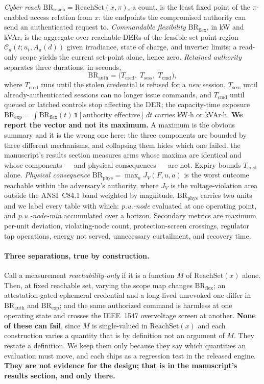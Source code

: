 \documentclass[review]{elsarticle}
\newcommand{\BRreach}{\mathrm{BR}_{\mathrm{reach}}}
\newcommand{\BRflex}{\mathrm{BR}_{\mathrm{flex}}}
\newcommand{\BRauth}{\mathrm{BR}_{\mathrm{auth}}}
\newcommand{\BRexp}{\mathrm{BR}_{\mathrm{exp}}}
\newcommand{\BRphys}{\mathrm{BR}_{\mathrm{phys}}}
\newcommand{\Reach}{\mathrm{ReachSet}}
\begin{document}
\emph{Cyber reach} $\BRreach=\Reach(x,\pi)$, a count, is the least fixed point of the
$\pi$-enabled access relation from $x$: the endpoints the compromised authority can send an
authenticated request to. \emph{Commandable flexibility} $\BRflex$, in kW and kVAr, is the
aggregate over reachable DERs of the feasible set-point region
$\mathcal{C}_d(t;u_t,A_\pi(d))$ given irradiance, state of charge, and inverter limits; a
read-only scope yields the current set-point alone, hence zero. \emph{Retained authority}
separates three durations, in seconds,
\begin{equation}
\BRauth=\big(T_{\mathrm{cred}},\;T_{\mathrm{sess}},\;T_{\mathrm{cmd}}\big),
\end{equation}
where $T_{\mathrm{cred}}$ runs until the stolen credential is refused for a \emph{new} session,
$T_{\mathrm{sess}}$ until already-authenticated sessions can no longer issue commands, and
$T_{\mathrm{cmd}}$ until queued or latched controls stop affecting the DER; the capacity-time
exposure $\BRexp=\int \BRflex(t)\,\mathbf{1}[\text{authority effective}]\,dt$ carries
kW$\cdot$h or kVAr$\cdot$h. \textbf{We report the vector and not its maximum.} A maximum is the
obvious summary and it is the wrong one here: the three components are bounded by three different
mechanisms, and collapsing them hides which one failed. the manuscript's results section measures arms
whose maxima are identical and whose components --- and physical consequences --- are not. Expiry
bounds $T_{\mathrm{cred}}$ alone. \emph{Physical consequence} $\BRphys=\max_{a}J_V(F,u,a)$ is the worst
outcome reachable within the adversary's authority, where $J_V$ is the voltage-violation area
outside the ANSI~C84.1 band weighted by magnitude. $\BRphys$ carries two units and we label
every table with which: \emph{p.u.-node} evaluated at one operating point, and
\emph{p.u.-node-min} accumulated over a horizon. Secondary metrics are maximum per-unit
deviation, violating-node count, protection-screen crossings, regulator tap operations, energy not served,
unnecessary curtailment, and recovery time.

\paragraph{Three separations, true by construction.}
Call a measurement \emph{reachability-only} if it is a function $M$ of $\Reach(x)$ alone. Then, at
fixed reachable set, varying the scope map changes $\BRflex$; an attestation-gated ephemeral
credential and a long-lived unrevoked one differ in $\BRauth$ and $\BRexp$; and the same
authorized command is harmless at one operating state and crosses the IEEE~1547 overvoltage screen
at another. \textbf{None of these can fail}, since $M$ is single-valued in $\Reach(x)$ and each
construction varies a quantity that is by definition not an argument of $M$. They restate a
definition. We keep them only because they say which quantities an evaluation must move, and each
ships as a regression test in the released engine. \textbf{They are not evidence for the design;
that is in the manuscript's results section, and only there.}
\end{document}
